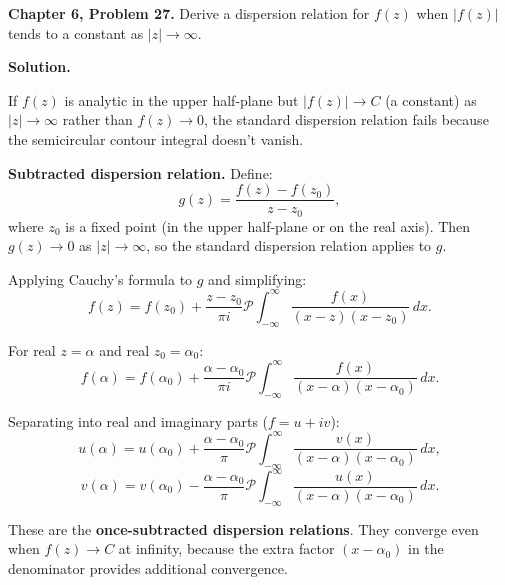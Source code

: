 \documentclass[12pt]{article}
\begin{document}
\textbf{Chapter 6, Problem 27.} Derive a dispersion relation for $f(z)$ when $|f(z)|$ tends to a constant as $|z| \to \infty$.

\bigskip
\textbf{Solution.}

If $f(z)$ is analytic in the upper half-plane but $|f(z)| \to C$ (a constant) as $|z| \to \infty$ rather than $f(z) \to 0$, the standard dispersion relation fails because the semicircular contour integral doesn't vanish.

\textbf{Subtracted dispersion relation.} Define:
\[
g(z) = \frac{f(z) - f(z_0)}{z - z_0},
\]
where $z_0$ is a fixed point (in the upper half-plane or on the real axis). Then $g(z) \to 0$ as $|z| \to \infty$, so the standard dispersion relation applies to $g$.

Applying Cauchy's formula to $g$ and simplifying:
\[
f(z) = f(z_0) + \frac{z - z_0}{\pi i}\mathcal{P}\int_{-\infty}^{\infty}\frac{f(x)}{(x-z)(x-z_0)}\,dx.
\]

For real $z = \alpha$ and real $z_0 = \alpha_0$:
\[
f(\alpha) = f(\alpha_0) + \frac{\alpha-\alpha_0}{\pi i}\mathcal{P}\int_{-\infty}^{\infty}\frac{f(x)}{(x-\alpha)(x-\alpha_0)}\,dx.
\]

Separating into real and imaginary parts ($f = u + iv$):
\[
u(\alpha) = u(\alpha_0) + \frac{\alpha-\alpha_0}{\pi}\mathcal{P}\int_{-\infty}^{\infty}\frac{v(x)}{(x-\alpha)(x-\alpha_0)}\,dx,
\]
\[
v(\alpha) = v(\alpha_0) - \frac{\alpha-\alpha_0}{\pi}\mathcal{P}\int_{-\infty}^{\infty}\frac{u(x)}{(x-\alpha)(x-\alpha_0)}\,dx.
\]

These are the \textbf{once-subtracted dispersion relations}. They converge even when $f(z) \to C$ at infinity, because the extra factor $(x-\alpha_0)$ in the denominator provides additional convergence.
\end{document}
